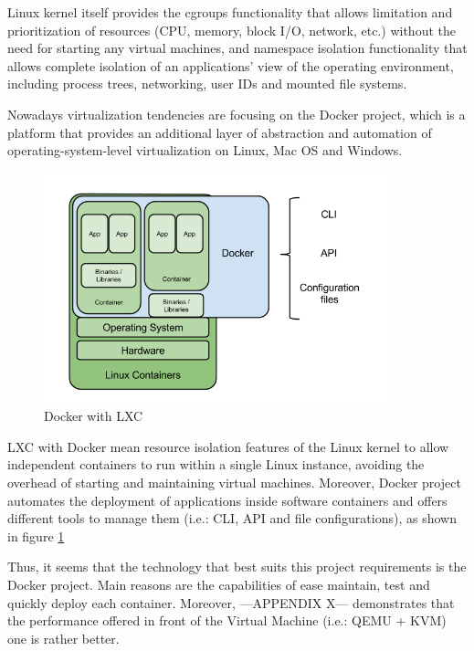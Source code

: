 \begin{itemize}
Linux kernel itself provides the cgroups functionality that allows limitation and prioritization of resources (CPU, memory, block I/O, network, etc.) without the need for starting any virtual machines, and namespace isolation functionality that allows complete isolation of an applications' view of the operating environment, including process trees, networking, user IDs and mounted file systems.

Nowadays virtualization tendencies are focusing on the Docker project, which is a platform that provides an additional layer of abstraction and automation of operating-system-level virtualization on Linux, Mac OS and Windows.
\begin{figure}[!htb]
\begin{center}
\includegraphics[width=0.9\textwidth]{./images/LXC.png}
\caption{Docker with LXC}
\label{F:DockerAndLXC}
\end{center}
\end{figure}

LXC with Docker mean resource isolation features of the Linux kernel to allow independent containers to run within a single Linux instance, avoiding the overhead of starting and maintaining virtual machines. Moreover, Docker project automates the deployment of applications inside software containers and offers different tools to manage them (i.e.: CLI, API and file configurations), as shown in figure \ref{F:DockerAndLXC} 
\end{itemize}

Thus, it seems that the technology that best suits this project requirements is the Docker project. Main reasons are the capabilities of ease maintain, test and quickly deploy each container. Moreover, ---APPENDIX X--- demonstrates that the performance offered in front of the Virtual Machine (i.e.: QEMU + KVM) one is rather better.

